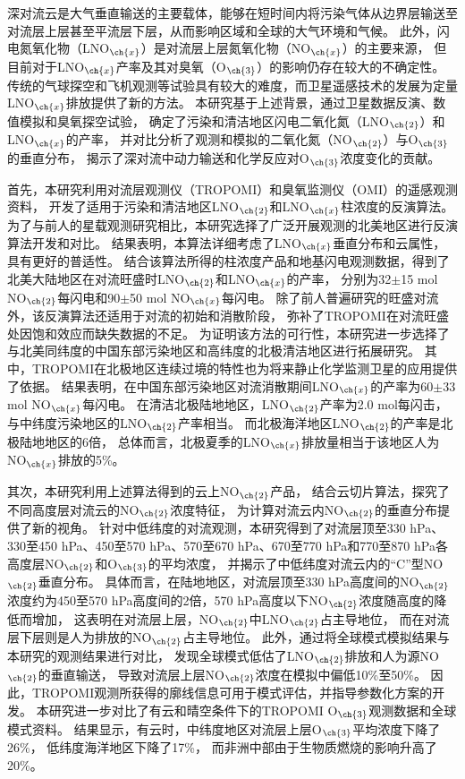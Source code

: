 
\abstract
{
深对流云是大气垂直输送的主要载体，能够在短时间内将污染气体从边界层输送至对流层上层甚至平流层下层，从而影响区域和全球的大气环境和气候。
此外，闪电氮氧化物（LNO$_{\ch{x}}$）是对流层上层氮氧化物（NO$_{\ch{x}}$）的主要来源，
但目前对于LNO$_{\ch{x}}$产率及其对臭氧（O$_{\ch{3}}$）的影响仍存在较大的不确定性。
传统的气球探空和飞机观测等试验具有较大的难度，而卫星遥感技术的发展为定量LNO$_{\ch{x}}$排放提供了新的方法。
本研究基于上述背景，通过卫星数据反演、数值模拟和臭氧探空试验，
确定了污染和清洁地区闪电二氧化氮（LNO$_{\ch{2}}$）和LNO$_{\ch{x}}$的产率，
并对比分析了观测和模拟的二氧化氮（NO$_{\ch{2}}$）与O$_{\ch{3}}$的垂直分布，
揭示了深对流中动力输送和化学反应对O$_{\ch{3}}$浓度变化的贡献。

首先，本研究利用对流层观测仪（TROPOMI）和臭氧监测仪（OMI）的遥感观测资料，
开发了适用于污染和清洁地区LNO$_{\ch{2}}$和LNO$_{\ch{x}}$柱浓度的反演算法。
为了与前人的星载观测研究相比，本研究选择了广泛开展观测的北美地区进行反演算法开发和对比。
结果表明，本算法详细考虑了LNO$_{\ch{x}}$垂直分布和云属性，具有更好的普适性。
结合该算法所得的柱浓度产品和地基闪电观测数据，得到了北美大陆地区在对流旺盛时LNO$_{\ch{2}}$和LNO$_{\ch{x}}$的产率，
分别为32$\pm$15 mol NO$_{\ch{2}}$每闪电和90$\pm$50 mol NO$_{\ch{x}}$每闪电。
除了前人普遍研究的旺盛对流外，该反演算法还适用于对流的初始和消散阶段，
弥补了TROPOMI在对流旺盛处因饱和效应而缺失数据的不足。
为证明该方法的可行性，本研究进一步选择了与北美同纬度的中国东部污染地区和高纬度的北极清洁地区进行拓展研究。
其中，TROPOMI在北极地区连续过境的特性也为将来静止化学监测卫星的应用提供了依据。
结果表明，在中国东部污染地区对流消散期间LNO$_{\ch{x}}$的产率为60$\pm$33 mol NO$_{\ch{x}}$每闪电。
在清洁北极陆地地区，LNO$_{\ch{2}}$产率为2.0 mol每闪击，与中纬度污染地区的LNO$_{\ch{2}}$产率相当。
而北极海洋地区LNO$_{\ch{2}}$的产率是北极陆地地区的6倍，
总体而言，北极夏季的LNO$_{\ch{x}}$排放量相当于该地区人为NO$_{\ch{x}}$排放的5\%。

其次，本研究利用上述算法得到的云上NO$_{\ch{2}}$产品，
结合云切片算法，探究了不同高度层对流云的NO$_{\ch{2}}$浓度特征，
为计算对流云内NO$_{\ch{2}}$的垂直分布提供了新的视角。
针对中低纬度的对流观测，本研究得到了对流层顶至330 hPa、330至450 hPa、450至570 hPa、570至670 hPa、670至770 hPa和770至870 hPa各高度层NO$_{\ch{2}}$和O$_{\ch{3}}$的平均浓度，
并揭示了中低纬度对流云内的“C”型NO$_{\ch{2}}$垂直分布。
具体而言，在陆地地区，对流层顶至330 hPa高度间的NO$_{\ch{2}}$浓度约为450至570 hPa高度间的2倍，570 hPa高度以下NO$_{\ch{2}}$浓度随高度的降低而增加，
这表明在对流层上层，NO$_{\ch{2}}$中LNO$_{\ch{2}}$占主导地位，
而在对流层下层则是人为排放的NO$_{\ch{2}}$占主导地位。
此外，通过将全球模式模拟结果与本研究的观测结果进行对比，
发现全球模式低估了LNO$_{\ch{2}}$排放和人为源NO$_{\ch{2}}$的垂直输送，
导致对流层上层NO$_{\ch{2}}$浓度在模拟中偏低10\%至50\%。
因此，TROPOMI观测所获得的廓线信息可用于模式评估，并指导参数化方案的开发。
本研究进一步对比了有云和晴空条件下的TROPOMI O$_{\ch{3}}$观测数据和全球模式资料。
结果显示，有云时，中纬度地区对流层上层O$_{\ch{3}}$平均浓度下降了26\%，
低纬度海洋地区下降了17\%，
而非洲中部由于生物质燃烧的影响升高了20\%。

}
